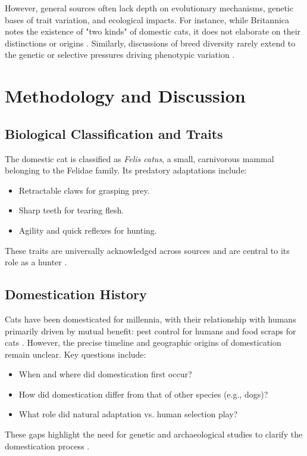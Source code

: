 \documentclass{article}
\begin{document}
However, general sources often lack depth on evolutionary mechanisms, genetic bases of trait variation, and ecological impacts. For instance, while Britannica notes the existence of "two kinds" of domestic cats, it does not elaborate on their distinctions or origins \cite{britannica}. Similarly, discussions of breed diversity rarely extend to the genetic or selective pressures driving phenotypic variation \cite{breed_diversity_gap}.

\section{Methodology and Discussion}
\subsection{Biological Classification and Traits}
The domestic cat is classified as \textit{Felis catus}, a small, carnivorous mammal belonging to the Felidae family. Its predatory adaptations include:
\begin{itemize}
    \item Retractable claws for grasping prey.
    \item Sharp teeth for tearing flesh.
    \item Agility and quick reflexes for hunting.
\end{itemize}
These traits are universally acknowledged across sources and are central to its role as a hunter \cite{biological_traits}.

\subsection{Domestication History}
Cats have been domesticated for millennia, with their relationship with humans primarily driven by mutual benefit: pest control for humans and food scraps for cats \cite{domestication_history}. However, the precise timeline and geographic origins of domestication remain unclear. Key questions include:
\begin{itemize}
    \item When and where did domestication first occur?
    \item How did domestication differ from that of other species (e.g., dogs)?
    \item What role did natural adaptation vs. human selection play?
\end{itemize}
These gaps highlight the need for genetic and archaeological studies to clarify the domestication process \cite{domestication_gap}.
\end{document}
